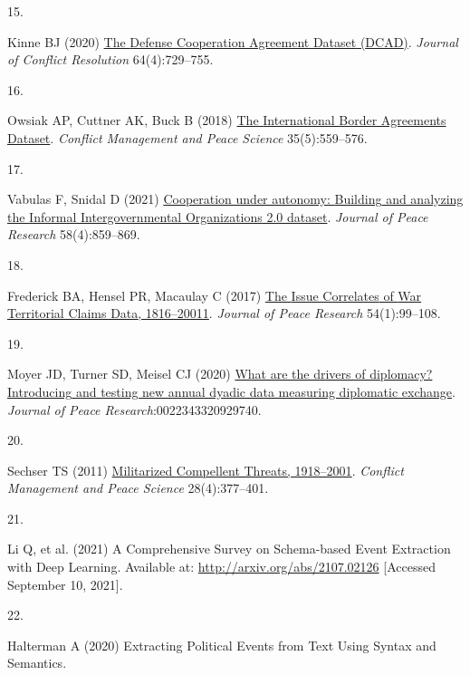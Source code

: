 \documentclass{article}
\newlength{\cslhangindent}
\newlength{\csllabelwidth}
\newlength{\cslentryspacingunit} %
\newenvironment{CSLReferences}[2] %
 {%
  \setlength{\parindent}{0pt}
  \ifodd #1
  \let\oldpar\par
  \def\par{\hangindent=\cslhangindent\oldpar}
  \fi
  \setlength{\parskip}{#2\cslentryspacingunit}
 }%
 {}
\newcommand{\CSLLeftMargin}[1]{\parbox[t]{\csllabelwidth}{#1}}
\newcommand{\CSLRightInline}[1]{\parbox[t]{\linewidth - \csllabelwidth}{#1}\break}
\begin{document}
\begin{CSLReferences}{0}{0}
\leavevmode{}%
\CSLLeftMargin{15. }%
\CSLRightInline{Kinne BJ (2020)
\href{https://doi.org/10.1177/0022002719857796}{The {Defense Cooperation
Agreement Dataset} ({DCAD})}. \emph{Journal of Conflict Resolution}
64(4):729--755.}

\leavevmode{}%
\CSLLeftMargin{16. }%
\CSLRightInline{Owsiak AP, Cuttner AK, Buck B (2018)
\href{https://doi.org/10.1177/0738894216646978}{The {International
Border Agreements Dataset}}. \emph{Conflict Management and Peace
Science} 35(5):559--576.}

\leavevmode{}%
\CSLLeftMargin{17. }%
\CSLRightInline{Vabulas F, Snidal D (2021)
\href{https://doi.org/10.1177/0022343320943920}{Cooperation under
autonomy: {Building} and analyzing the {Informal Intergovernmental
Organizations} 2.0 dataset}. \emph{Journal of Peace Research}
58(4):859--869.}

\leavevmode{}%
\CSLLeftMargin{18. }%
\CSLRightInline{Frederick BA, Hensel PR, Macaulay C (2017)
\href{https://doi.org/10.1177/0022343316676311}{The {Issue Correlates}
of {War Territorial Claims Data}, 1816--20011}. \emph{Journal of Peace
Research} 54(1):99--108.}

\leavevmode{}%
\CSLLeftMargin{19. }%
\CSLRightInline{Moyer JD, Turner SD, Meisel CJ (2020)
\href{https://doi.org/10.1177/0022343320929740}{What are the drivers of
diplomacy? {Introducing} and testing new annual dyadic data measuring
diplomatic exchange}. \emph{Journal of Peace
Research}:0022343320929740.}

\leavevmode{}%
\CSLLeftMargin{20. }%
\CSLRightInline{Sechser TS (2011)
\href{https://doi.org/10.1177/0738894211413066}{Militarized {Compellent
Threats}, 1918--2001}. \emph{Conflict Management and Peace Science}
28(4):377--401.}

\leavevmode{}%
\CSLLeftMargin{21. }%
\CSLRightInline{Li Q, et al. (2021) A {Comprehensive Survey} on
{Schema-based Event Extraction} with {Deep Learning}. Available at:
\url{http://arxiv.org/abs/2107.02126} {[}Accessed September 10,
2021{]}.}

\leavevmode{}%
\CSLLeftMargin{22. }%
\CSLRightInline{Halterman A (2020) Extracting {Political Events} from
{Text Using Syntax} and {Semantics}.}


\end{CSLReferences}
\end{document}
